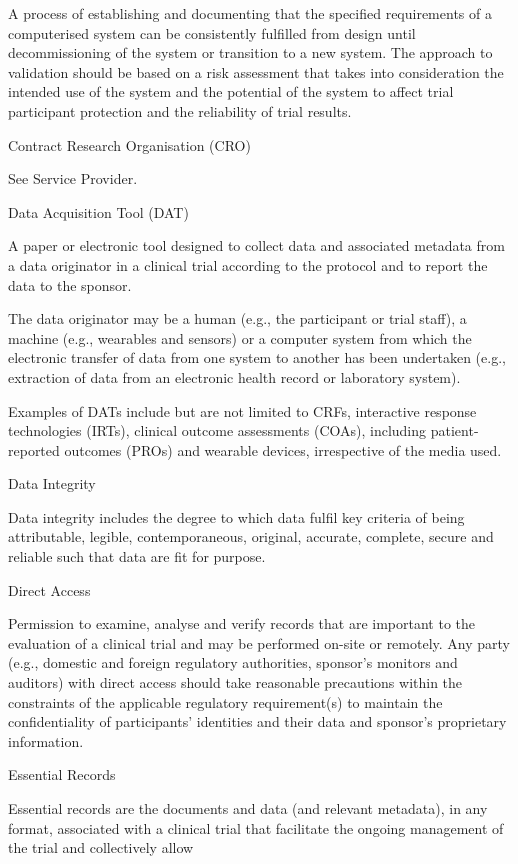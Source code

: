 \documentclass[11pt]{article}
\begin{document}
A process of establishing and documenting that the specified requirements of a computerised system can be consistently fulfilled from design until decommissioning of the system or transition to a new system. The approach to validation should be based on a risk assessment that takes into consideration the intended use of the system and the potential of the system to affect trial participant protection and the reliability of trial results.


Contract Research Organisation (CRO)


See Service Provider.


Data Acquisition Tool (DAT)


A paper or electronic tool designed to collect data and associated metadata from a data originator in a clinical trial according to the protocol and to report the data to the sponsor.


The data originator may be a human (e.g., the participant or trial staff), a machine (e.g., wearables and sensors) or a computer system from which the electronic transfer of data from one system to another has been undertaken (e.g., extraction of data from an electronic health record or laboratory system).


Examples of DATs include but are not limited to CRFs, interactive response technologies (IRTs), clinical outcome assessments (COAs), including patient-reported outcomes (PROs) and wearable devices, irrespective of the media used.


Data Integrity


Data integrity includes the degree to which data fulfil key criteria of being attributable, legible, contemporaneous, original, accurate, complete, secure and reliable such that data are fit for purpose.


Direct Access


Permission to examine, analyse and verify records that are important to the evaluation of a clinical trial and may be performed on-site or remotely. Any party (e.g., domestic and foreign regulatory authorities, sponsor's monitors and auditors) with direct access should take reasonable precautions within the constraints of the applicable regulatory requirement(s) to maintain the confidentiality of participants' identities and their data and sponsor's proprietary information.


Essential Records


Essential records are the documents and data (and relevant metadata), in any format, associated with a clinical trial that facilitate the ongoing management of the trial and collectively allow
\end{document}

